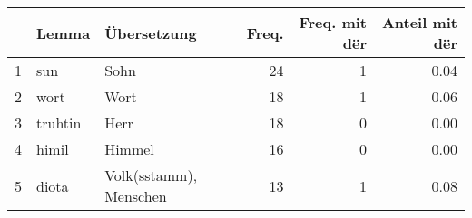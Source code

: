 \begin{tabular}{rllrrr}
  \hline
 & Lemma & Übersetzung & Freq. & Freq. mit dër & Anteil mit dër \\ 
  \hline
1 & sun & Sohn &  24 &   1 & 0.04 \\ 
  2 & wort & Wort &  18 &   1 & 0.06 \\ 
  3 & truhtin & Herr &  18 &   0 & 0.00 \\ 
  4 & himil & Himmel &  16 &   0 & 0.00 \\ 
  5 & diota & Volk(sstamm), Menschen &  13 &   1 & 0.08 \\ 
   \hline
\end{tabular}
